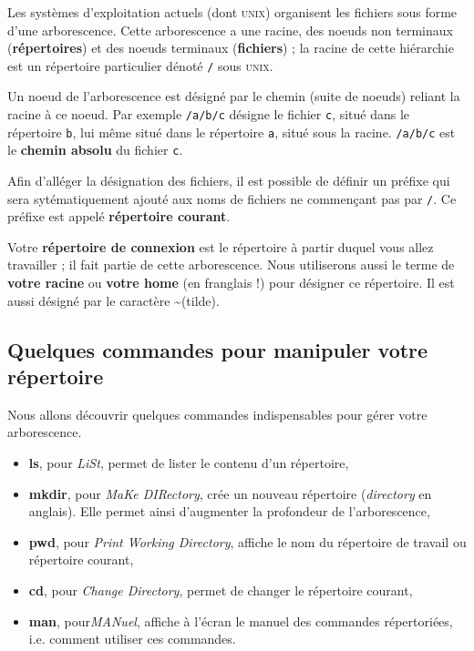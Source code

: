 \documentclass[a4paper,11pt]{article}
\newcommand{\unix}{\textsc{unix}\xspace}
\newcommand{\shell}{\textsc{shell}\xspace}
\begin{document}
Les systèmes d'exploitation actuels (dont \unix) organisent les fichiers
sous forme d'une arborescence. Cette arborescence a une racine,
des noeuds non terminaux (\textbf{répertoires}) et des noeuds terminaux
(\textbf{fichiers}) ; la racine de cette hiérarchie
est un répertoire particulier dénoté \verb+/+ sous \unix.

Un noeud de l'arborescence est désigné par le chemin (suite de noeuds)
reliant la racine à ce noeud. Par exemple \verb+/a/b/c+ désigne le fichier
\verb+c+, situé dans le répertoire \verb+b+, lui même situé dans le répertoire
\verb+a+, situé sous la racine.  \verb+/a/b/c+ est le \textbf{chemin absolu} du
fichier \verb+c+.

Afin d'alléger la désignation des fichiers, il est possible de définir un
préfixe qui sera sytématiquement ajouté aux noms de fichiers ne commençant pas
par \verb+/+. Ce préfixe est appelé \textbf{répertoire courant}.

Votre \textbf{répertoire de connexion} est le répertoire à partir duquel vous allez
travailler ; il fait partie de cette arborescence. Nous utiliserons aussi le
terme de \textbf{votre racine} ou \textbf{votre home} (en franglais !)
pour désigner ce répertoire. Il est aussi désigné par le caractère
\textasciitilde (tilde).


\subsection{Quelques commandes pour manipuler votre répertoire}

Nous allons découvrir quelques commandes indispensables pour gérer votre
arborescence.

\begin{itemize}
  \item \textbf{ls}, pour \emph{LiSt}, permet de lister le contenu d'un
        répertoire,
  \item \textbf{mkdir}, pour \emph{MaKe DIRectory}, crée un nouveau
        répertoire (\textit{directory} en anglais). Elle permet ainsi
        d'augmenter la profondeur de l'arborescence,
  \item \textbf{pwd}, pour \emph{Print Working Directory}, affiche le nom du
        répertoire de travail ou répertoire courant,
  \item \textbf{cd}, pour \emph{Change Directory}, permet de changer le
        répertoire courant,
  \item \textbf{man}, pour\emph{MANuel}, affiche à l'écran le manuel des
        commandes répertoriées, i.e. comment utiliser ces commandes.
\end{itemize}
\end{document}
